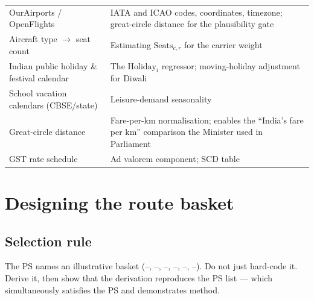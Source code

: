 \begin{center}
\footnotesize
\begin{tabularx}{\textwidth}{@{}L{3.4cm} X@{}}
\toprule
{} &  \\
\midrule
OurAirports / OpenFlights & IATA and ICAO codes, coordinates, timezone; great-circle distance for the plausibility gate \\
Aircraft type $\to$ seat count & Estimating $\text{Seats}_{c,r}$ for the carrier weight \\
Indian public holiday \& festival calendar & The $\text{Holiday}_i$ regressor; moving-holiday adjustment for Diwali \\
School vacation calendars (CBSE/state) & Leisure-demand seasonality \\
Great-circle distance & Fare-per-km normalisation; enables the ``India's fare per km'' comparison the Minister used in Parliament \\
GST rate schedule & Ad valorem component; SCD table \\
\bottomrule
\end{tabularx}
\end{center}

\section{Designing the route basket}

\subsection{Selection rule}

The PS names an illustrative basket (--, --,
--, --, --, --). Do not
just hard-code it. Derive it, then show that the derivation reproduces the PS list --- which
simultaneously satisfies the PS and demonstrates method.

